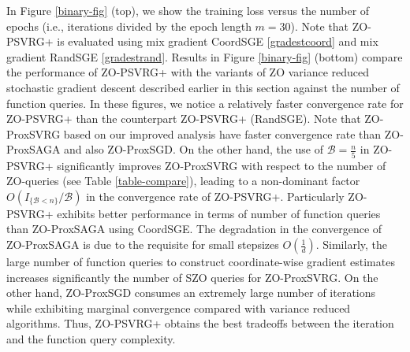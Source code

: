 In Figure \ref{binary-fig} (top), we show the training loss versus the number of epochs (i.e., iterations divided by the
epoch length $m = 30$). Note that ZO-PSVRG+ is evaluated using mix gradient CoordSGE \eqref{gradestcoord} and mix gradient RandSGE \eqref{gradestrand}.
Results in Figure \ref{binary-fig} (bottom) compare the performance of ZO-PSVRG+ with the variants of ZO variance reduced stochastic gradient descent described earlier in this section against the number of function queries. In these figures, we notice  a relatively faster convergence rate for ZO-PSVRG+ than the counterpart ZO-PSVRG+ (RandSGE). Note that ZO-ProxSVRG based on
our improved analysis have faster
convergence rate than ZO-ProxSAGA and also ZO-ProxSGD. On the other hand, the use of $\mathcal{B} = \frac{n}{5}$ in ZO-PSVRG+ significantly
improves ZO-ProxSVRG with respect to the number of ZO-queries (see Table \ref{table-compare}), leading to a non-dominant factor $O(I_{\{\mathcal{B} < n\}}/\mathcal{B})$ in the convergence rate of ZO-PSVRG+. Particularly ZO-PSVRG+ exhibits better performance in terms of number of function queries than ZO-ProxSAGA using CoordSGE.  The degradation in the convergence of ZO-ProxSAGA  is due to the requisite for small stepsizes $O(\frac{1}{d})$. Similarly, the large number of function queries to construct
coordinate-wise gradient estimates increases significantly the number of SZO queries for ZO-ProxSVRG. On the other hand, ZO-ProxSGD consumes an extremely large number of iterations while exhibiting marginal convergence compared with variance reduced algorithms. Thus, ZO-PSVRG+ obtains the best tradeoffs between the iteration and the function query complexity.





